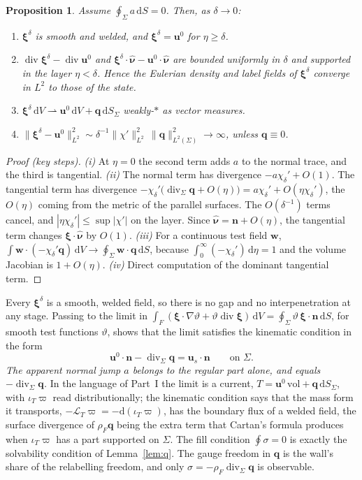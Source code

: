 \documentclass[11pt]{article}
\newtheorem{proposition}{Proposition}
\theoremstyle{definition}
\theoremstyle{remark}
\newcommand{\bu}{\mathbf{u}}
\newcommand{\bw}{\mathbf{w}}
\newcommand{\bn}{\mathbf{n}}
\newcommand{\bq}{\mathbf{q}}
\newcommand{\bxi}{\boldsymbol{\xi}}
\newcommand{\dS}{\,\mathrm{d}S}
\newcommand{\dV}{\,\mathrm{d}V}
\newcommand{\Div}{\operatorname{div}}
\newcommand{\divS}{\operatorname{div}_\Sigma}
\newcommand{\vol}{\mathrm{vol}}
\newcommand{\nuh}{\hat{\boldsymbol{\nu}}}
\begin{document}
\begin{proposition}
\label{prop:layer}
Assume $\oint_\Sigma a\dS = 0$. Then, as $\delta \to 0$:
\begin{enumerate}[label=(\roman*)]
\item $\bxi^\delta$ is smooth and welded, and $\bxi^\delta = \bu^0$ for
  $\eta \ge \delta$.
\item $\Div\bxi^\delta - \Div\bu^0$ and $\bxi^\delta\cdot\nuh -
  \bu^0\cdot\nuh$ are bounded uniformly in $\delta$ and supported in the
  layer $\eta < \delta$. Hence the Eulerian density and label fields of
  $\bxi^\delta$ converge in $L^2$ to those of the state.
\item $\bxi^\delta\dV \rightharpoonup \bu^0\dV + \bq\dS_\Sigma$
  weakly-$*$ as vector measures.
\item $\|\bxi^\delta - \bu^0\|_{L^2}^2 \sim
  \delta^{-1}\|\chi'\|_{L^2}^2\,\|\bq\|_{L^2(\Sigma)}^2 \to \infty$,
  unless $\bq \equiv 0$.
\end{enumerate}
\end{proposition}
\begin{proof}[Proof (key steps)]
\emph{(i)} At $\eta = 0$ the second term adds $a$ to the normal trace,
and the third is tangential.
\emph{(ii)} The normal term has divergence $-a\chi_\delta' + O(1)$. The
tangential term has divergence $-\chi_\delta'\bigl(\divS\bq +
O(\eta)\bigr) = a\chi_\delta' + O(\eta\chi_\delta')$, the $O(\eta)$
coming from the metric of the parallel surfaces. The $O(\delta^{-1})$
terms cancel, and $|\eta\chi_\delta'| \le \sup|\chi'|$ on the layer.
Since $\nuh = \bn + O(\eta)$, the tangential term changes
$\bxi\cdot\nuh$ by $O(1)$.
\emph{(iii)} For a continuous test field $\bw$, $\int\bw\cdot
(-\chi_\delta'\bq)\dV \to \oint_\Sigma\bw\cdot\bq\dS$, because
$\int_0^\infty(-\chi_\delta')\,\mathrm d\eta = 1$ and the volume Jacobian
is $1 + O(\eta)$.
\emph{(iv)} Direct computation of the dominant tangential term.
\end{proof}

Every $\bxi^\delta$ is a smooth, welded field, so there is no gap and
no interpenetration at any stage. Passing to the limit in
$\int_F(\bxi\cdot\nabla\vartheta + \vartheta\Div\bxi)\dV =
\oint_\Sigma\vartheta\,\bxi\cdot\bn\dS$, for smooth test functions
$\vartheta$, shows that the limit satisfies the kinematic condition in
the form
\begin{equation*}
  \bu^0\cdot\bn - \divS\bq = \bu_s\cdot\bn\qquad\text{on } \Sigma .
\end{equation*}
\emph{The apparent normal jump $a$ belongs to the regular part alone,
and equals $-\divS\bq$.} In the language of Part~I the limit is a
current, $T = \bu^0\,\vol + \bq\dS_\Sigma$, with $\iota_T\varpi$ read
distributionally; the kinematic condition says that the mass form it
transports, $-\mathcal L_T\varpi = -\mathrm d(\iota_T\varpi)$, has the
boundary flux of a welded field, the surface divergence of $\rho_F\bq$
being the extra term that Cartan's formula produces when
$\iota_T\varpi$ has a part supported on $\Sigma$. The fill condition
$\oint\sigma = 0$ is exactly the solvability condition of
Lemma~\ref{lem:q}. The gauge freedom in $\bq$ is the wall's share of
the relabelling freedom, and only $\sigma = -\rho_F\divS\bq$ is
observable.
\end{document}
